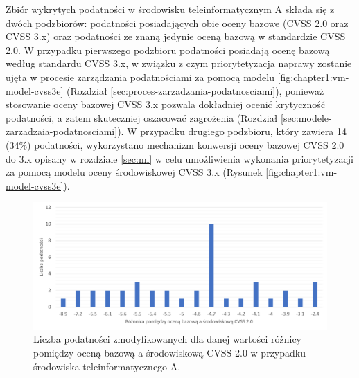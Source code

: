 Zbiór wykrytych podatności w środowisku teleinformatycznym A składa się z dwóch podzbiorów: podatności posiadających obie oceny bazowe (CVSS 2.0 oraz CVSS 3.x) oraz podatności ze znaną jedynie oceną bazową w standardzie CVSS 2.0. W przypadku pierwszego podzbioru podatności posiadają ocenę bazową według standardu CVSS 3.x, w związku z czym priorytetyzacja naprawy zostanie ujęta w procesie zarządzania podatnościami za pomocą modelu \ref{fig:chapter1:vm-model-cvss3e} (Rozdział \ref{sec:proces-zarzadzania-podatnosciami}), ponieważ stosowanie oceny bazowej CVSS 3.x pozwala dokładniej ocenić krytyczność podatności, a zatem skuteczniej oszacować zagrożenia (Rozdział \ref{sec:modele-zarzadzaia-podatnosciami}). W przypadku drugiego podzbioru, który zawiera 14 (34\%) podatności, wykorzystano mechanizm konwersji oceny bazowej CVSS 2.0 do 3.x opisany w rozdziale \ref{sec:ml} w celu umożliwienia wykonania priorytetyzacji za pomocą modelu oceny środowiskowej CVSS 3.x (Rysunek \ref{fig:chapter1:vm-model-cvss3e}).

\begin{figure}[!ht]
\centering
\includegraphics[width=.9\textwidth]{Chapters/Eksperymenty/env_A_results/changes_cvss_2.pdf}
\caption{Liczba podatności zmodyfikowanych dla danej wartości różnicy pomiędzy oceną bazową a środowiskową CVSS 2.0 w przypadku środowiska teleinformatycznego A.}
\label{fig:chapter6:env_a:cvss_2_changes}
\end{figure}

